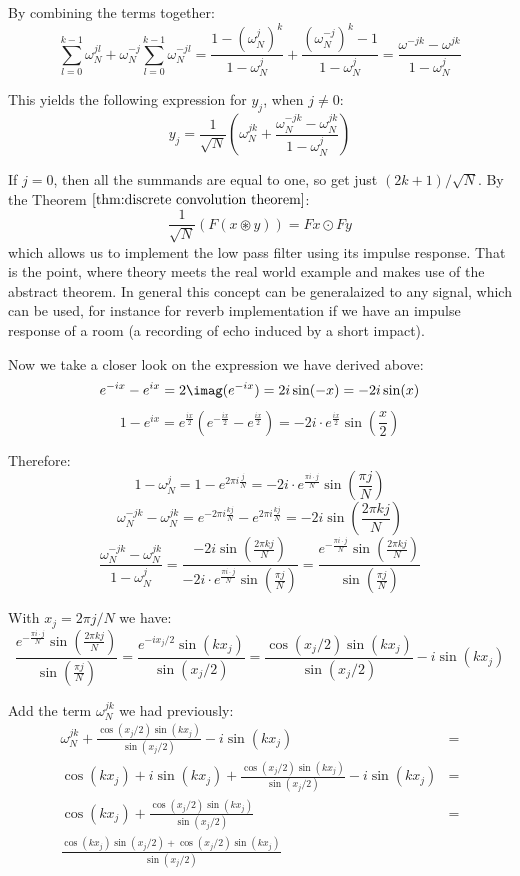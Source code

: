 By combining the terms together:
\[
	\sum_{l=0}^{k-1} \omega_N^{jl} + \omega_N^{-j} \sum_{l=0}^{k-1} \omega_N^{-jl}
	= \frac{1 - {\left(\omega_N^{j}\right)}^k}{1 - \omega_N^j} + \frac{{\left(\omega_N^{-j}\right)}^k - 1}{1 - \omega_N^{j}}
	= \frac{\omega^{-jk} - \omega^{jk}}{1 - \omega_N^{j}}\]

This yields the following expression for $y_j$, when $j\neq 0$:
\[y_{j}  = \frac{1}{\sqrt{N}} \left(\omega_N^{jk} + \frac{\omega_N^{-jk} - \omega_N^{jk}}{1 - \omega_N^{j}} \right)\]

If $j = 0$, then all the summands are equal to one, so get just $(2k+1)/\sqrt{N}$.
By the Theorem $\ref{thm:discrete convolution theorem}$:
\[\frac{1}{\sqrt N}(F(x\circledast y)) = Fx \odot Fy\]
which allows us to implement the low pass filter using its impulse response. That is the point, where theory meets the real world example and makes use of the abstract theorem. In general this concept can be generalaized to any signal, which can be used, for instance for reverb implementation if we have an impulse response of a room (a recording of echo induced by a short impact).

Now we take a closer look on the expression we have derived above:
\[
	e^{-ix}-e^{ix} = 2\imag(e^{-ix}) = 2i\sin(-x) = -2i\sin(x)\]
\[
	1-e^{ix}
	= e^{\frac{ix}{2}}\left(e^{-\frac{ix}{2}} - e^{\frac{ix}{2}}\right)
	= -2i\cdot e^{\frac{ix}{2}} \sin \left(\frac{x}{2}\right)\]

Therefore:
\[
	1 - \omega_N^{j} = 1-e^{2\pi i\frac{j}{N}}
	= -2i\cdot e^{\frac{\pi i\cdot j}{N}} \sin \left(\frac{\pi j}{N}\right)\]
\[
	\omega_N^{-jk} - \omega_N^{jk}
	= e^{-2\pi i\frac{kj}{N}}-e^{2\pi i\frac{kj}{N}}
	= -2i \sin\left(\frac{2\pi kj}{N}\right)\]
\[
	\frac{\omega_N^{-jk} - \omega_N^{jk}}{1 - \omega_N^{j}}
	= \frac{-2i \sin\left(\frac{2\pi kj}{N}\right)}{-2i\cdot e^{\frac{\pi i\cdot j}{N}} \sin \left(\frac{\pi j}{N}\right)}
	= \frac{e^{-\frac{\pi i\cdot j}{N}} \sin\left(\frac{2\pi kj}{N}\right)}{\sin \left(\frac{\pi j}{N}\right)}\]

With $x_j = 2\pi j / N$ we have:
\[
	\frac{e^{-\frac{\pi i\cdot j}{N}} \sin\left(\frac{2\pi kj}{N}\right)}{\sin \left(\frac{\pi j}{N}\right)}
	= \frac{e^{-ix_j/2} \sin\left(kx_j\right)}{\sin \left(x_j/2\right)}
	= \frac{\cos(x_j/2) \sin(kx_j)}{\sin(x_j/2)} - i \sin\left(kx_j\right)\]

Add the term $\omega_N^{jk}$ we had previously:
\begin{equation}
	\begin{aligned}
		\omega_N^{jk} + \frac{\cos(x_j/2) \sin(kx_j)}{\sin(x_j/2)} - i \sin(kx_j)
		 & = \\ \cos(kx_j) + i \sin(kx_j) + \frac{\cos(x_j/2) \sin(kx_j)}{\sin(x_j/2)} - i \sin(kx_j)
		 & = \\ \cos(kx_j) + \frac{\cos(x_j/2) \sin(kx_j)}{\sin(x_j/2)}
		 & = \\ \frac{\cos(kx_j) \sin(x_j/2) + \cos(x_j/2) \sin(kx_j)}{\sin(x_j/2)}
	\end{aligned}
	\label{eq:lpf before trig id}
\end{equation}

